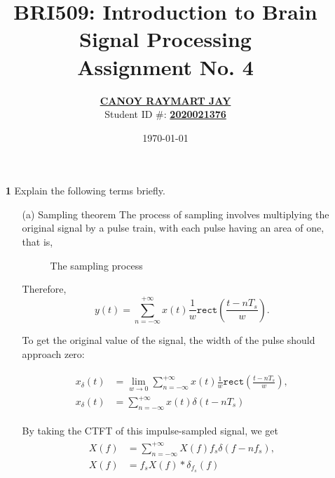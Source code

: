 \documentclass[a4paper, 12pt]{article}
\begin{document}
\title{BRI509: Introduction to Brain Signal Processing \\ Assignment No. 4}
\author{\underline{\textbf{CANOY RAYMART JAY}} \\ Student ID \#: \underline{\textbf{2020021376}}}
\date{\today}
\maketitle

\begin{itemize}
\item[\textbf{1}]{Explain the following terms briefly.}

\begin{itemize}
\item[(a)]{Sampling theorem}
The process of sampling involves multiplying the original signal by a pulse train, with each pulse having an area of one, that is,

\begin{figure}[h!]
\caption{\label{fig:sampling_theorem} The sampling process}
\end{figure}

Therefore, 
\begin{equation}
y(t) = \sum_{n=-\infty}^{+\infty}{x(t) \frac{1}{w} \mathtt{rect}\left( \frac{t - nT_{s}}{w}\right)}.
\end{equation}

To get the original value of the signal, the width of the pulse should approach zero:

\begin{equation}
\begin{gathered}
\begin{alignedat}{1}
x_{\delta}(t) &= \lim_{w \to 0}  \sum_{n=-\infty}^{+\infty}{x(t) \frac{1}{w} \mathtt{rect}\left( \frac{t - nT_{s}}{w}\right)}, \\
x_{\delta}(t) &= \sum_{n=-\infty}^{+\infty}{x(t) \delta \left(t - nT_{s}\right)}
\end{alignedat}
\end{gathered}
\end{equation}

By taking the CTFT of this impulse-sampled signal, we get
\begin{equation}
\begin{gathered}
\begin{alignedat}{1}
X(f) & = \sum_{n=-\infty}^{+\infty} {X(f) f_{s}\delta \left(f - nf_{s} \right)}, \\
X(f) & = f_{s} X(f) \ast \delta_{f_{s}}(f)
\end{alignedat}
\end{gathered}
\end{equation}


\end{itemize}
\end{itemize}
\end{document}
